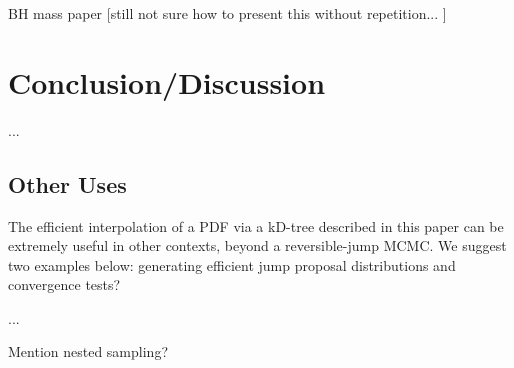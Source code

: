 \documentclass[prd,preprint]{revtex4}
\begin{document}
BH mass paper [still not sure how to present this without repetition...  ]  




\section{Conclusion/Discussion}

...

\subsection{Other Uses}
The efficient interpolation of a PDF via a kD-tree described in this paper can be extremely useful in other contexts, beyond a reversible-jump MCMC.  We suggest two examples below: generating efficient jump proposal distributions and convergence tests?

...

Mention nested sampling?

\nocite{Littenberg2009}


\end{document}
